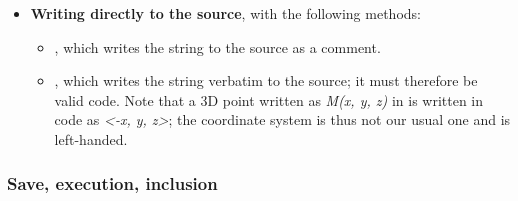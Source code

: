 \begin{itemize}
\begin{itemize}
            \item {}, where  is a list of \textbf{two} \povray objects; these objects may be either the name of an already created object or a \povray command given as a string. The result is the difference: object1 minus object2.
        \end{itemize}
    
    \item \textbf{Writing directly to the source}, with the following methods:
        \begin{itemize}
            \item {}, which writes the string  to the source as a comment.
            \item {}, which writes the string  verbatim to the source; it must therefore be valid \povray code. Note that a 3D point written as \emph{M(x, y, z)} in \luadrawenv is written in \povray code as \emph{<-x, y, z>}; the \povray coordinate system is thus not our usual one and is left-handed.
        \end{itemize}
\end{itemize}

\subsubsection{Save, execution, inclusion}

